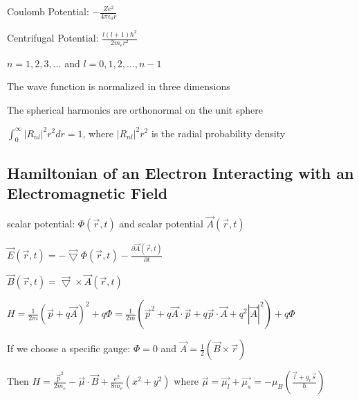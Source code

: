 \documentclass[12pt]{article}
\begin{document}
\begin{spacing}{2.0}
Coulomb Potential: $-\frac{Ze^2}{4\pi\epsilon_0r}$

Centrifugal Potential: $\frac{l(l+1)\hbar^2}{2m_e r^2}$

$n=1,2,3,\ldots$ and $l=0,1,2,\ldots, n-1$

The wave function is normalized in three dimensions

The spherical harmonics are orthonormal on the unit sphere

$\int_{0}^{\infty} |R_{nl}|^2r^2 dr=1$, where $|R_{nl}|^2r^2$ is the radial probability density

\subsection{Hamiltonian of an Electron Interacting with an Electromagnetic Field}

scalar potential: $\Phi(\vec{r},t)$ and scalar potential $\vec{A}(\vec{r},t)$

$\vec{E}(\vec{r},t)= - \vec{\bigtriangledown} \Phi(\vec{r},t)- \frac{\partial \vec{A}(\vec{r},t)}{\partial t}$

$\vec{B}(\vec{r},t)= \vec{\bigtriangledown} \times \vec{A}(\vec{r},t)$

$H=\frac{1}{2m}(\vec{p} + q\vec{A})^2 + q\Phi= \frac{1}{2m} \left( \vec{p}^2+ q\vec{A}\cdot\vec{p} + q\vec{p}\cdot\vec{A} + q^2|\vec{A}|^2 \right) + q\Phi$

If we choose a specific gauge: $\Phi=0$ and $\vec{A}=\frac{1}{2} \left( \vec{B}\times \vec{r} \right)$

Then $H=\frac{\vec{p}^2}{2m_e} - \vec{\mu}\cdot\vec{B} + \frac{e^2}{8m_e}(x^2+y^2)$ where $\vec{\mu}= \vec{\mu_l} + \vec{\mu_s}= -\mu_B \left( \frac{\vec{l}+g_e\vec{s}}{\hbar} \right)$

\end{spacing}
\end{document}
